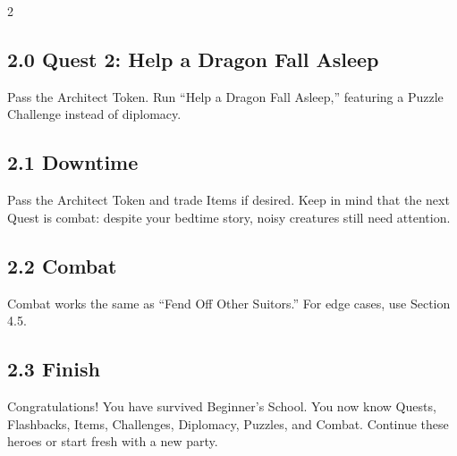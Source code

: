 \clearpage
\begin{multicols}{2}

\subsection*{2.0 Quest 2: Help a Dragon Fall Asleep}
Pass the Architect Token. Run ``Help a Dragon Fall Asleep,'' featuring a Puzzle Challenge instead of diplomacy.
\DndrGraphicPlaceholder{2.35in}
\begin{enumerate}
\end{enumerate}

\subsection*{2.1 Downtime}
Pass the Architect Token and trade Items if desired. Keep in mind that the next Quest is combat: despite your bedtime story, noisy creatures still need attention.

\subsection*{2.2 Combat}
Combat works the same as ``Fend Off Other Suitors.'' For edge cases, use Section 4.5.

\subsection*{2.3 Finish}
Congratulations! You have survived Beginner's School. You now know Quests, Flashbacks, Items, Challenges, Diplomacy, Puzzles, and Combat. Continue these heroes or start fresh with a new party.
\end{multicols}
